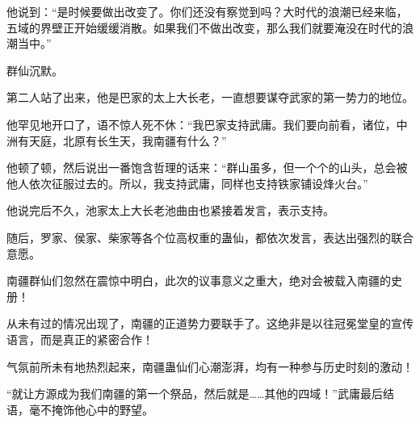 \begin{this_body}
他说到：“是时候要做出改变了。你们还没有察觉到吗？大时代的浪潮已经来临，五域的界壁正开始缓缓消散。如果我们不做出改变，那么我们就要淹没在时代的浪潮当中。”

群仙沉默。

第二人站了出来，他是巴家的太上大长老，一直想要谋夺武家的第一势力的地位。

他罕见地开口了，语不惊人死不休：“我巴家支持武庸。我们要向前看，诸位，中洲有天庭，北原有长生天，我南疆有什么？”

他顿了顿，然后说出一番饱含哲理的话来：“群山虽多，但一个个的山头，总会被他人依次征服过去的。所以，我支持武庸，同样也支持铁家铺设烽火台。”

他说完后不久，池家太上大长老池曲由也紧接着发言，表示支持。

随后，罗家、侯家、柴家等各个位高权重的蛊仙，都依次发言，表达出强烈的联合意愿。

南疆群仙们忽然在震惊中明白，此次的议事意义之重大，绝对会被载入南疆的史册！

从未有过的情况出现了，南疆的正道势力要联手了。这绝非是以往冠冕堂皇的宣传语言，而是真正的紧密合作！

气氛前所未有地热烈起来，南疆蛊仙们心潮澎湃，均有一种参与历史时刻的激动！

“就让方源成为我们南疆的第一个祭品，然后就是……其他的四域！”武庸最后结语，毫不掩饰他心中的野望。

\end{this_body}

